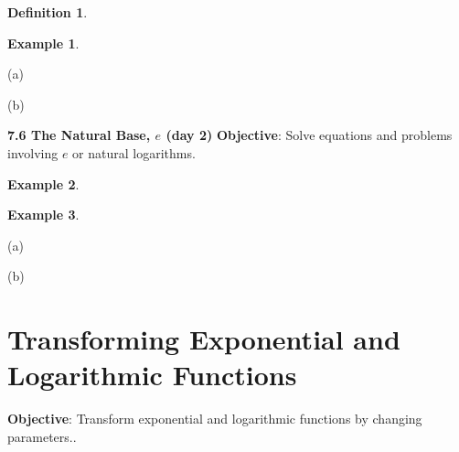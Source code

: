 \documentclass{report}
\theoremstyle{definition}
\newtheorem{example}{\bf Example}
\newtheorem{definition}{\bf Definition}[section]
\begin{document}
\begin{definition}
\end{definition}

\begin{example}

\end{example}

\begin{minipage}[t]{0.45\linewidth}
(a) 
\end{minipage}
\hfill
\begin{minipage}[t]{0.45\linewidth}
(b) 
\end{minipage}


\vfill
\noindent{}
 \newpage

\noindent \Large \textbf{7.6 The Natural Base, $e$ (day 2)} \normalsize
 \indent\hfill\small\noindent \textbf{Objective}: Solve equations and problems involving $e$ or natural logarithms.\normalsize\\

\begin{example}

\end{example}
\vfill

\begin{example}

\end{example}
(a) 
\vfill

(b) 


\vfill
\noindent{}
 \newpage

 \section{Transforming Exponential and Logarithmic Functions }
 \noindent \hfill\small \noindent \textbf{Objective}: Transform exponential and logarithmic functions by changing parameters.. \normalsize\\
 \setcounter{example}{0}
 \setcounter{definition}{0}
\end{document}
